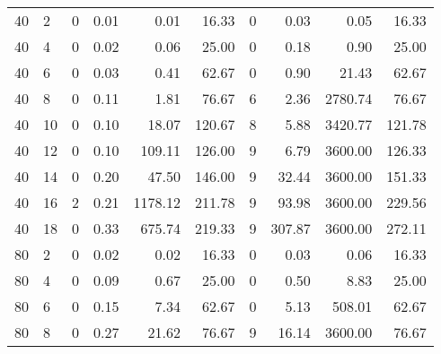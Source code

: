 \begin{appendices}
\begin{table*}[h]
\begin{center}
\begin{tabular} {l l | r r r r | r r r r}
 40 & 2                                  &  0           &  0.01         &  0.01      &  16.33           &  0            &   0.03       & 0.05        &  16.33       \\ 
 40 & 4                                  &  0           &  0.02         &  0.06      &  25.00           &  0            &   0.18       & 0.90        &  25.00       \\ 
 40 & 6                                  &  0           &  0.03         &  0.41      &  62.67           &  0            &   0.90       & 21.43       &  62.67       \\ 
 40 & 8                                  &  0           &  0.11         &  1.81      &  76.67           &  6            &   2.36       & 2780.74     &  76.67       \\ 
 40 & 10                                 &  0           &  0.10         &  18.07     &  120.67          &  8            &   5.88       & 3420.77     &  121.78      \\ 
 40 & 12                                 &  0           &  0.10         &  109.11    &  126.00          &  9            &   6.79       & 3600.00     &  126.33      \\ 
 40 & 14                                 &  0           &  0.20         &  47.50     &  146.00          &  9            &   32.44      & 3600.00     &  151.33      \\ 
 40 & 16                                 &  2           &  0.21         &  1178.12   &  211.78          &  9            &   93.98      & 3600.00     &  229.56      \\ 
 40 & 18                                 &  0           &  0.33         &  675.74    &  219.33          &  9            &   307.87     & 3600.00     &  272.11      \\ 
 80 & 2                                  &  0           &  0.02         &  0.02      &  16.33           &  0            &   0.03       & 0.06        &  16.33       \\ 
 80 & 4                                  &  0           &  0.09         &  0.67      &  25.00           &  0            &   0.50       & 8.83        &  25.00       \\ 
 80 & 6                                  &  0           &  0.15         &  7.34      &  62.67           &  0            &   5.13       & 508.01      &  62.67       \\ 
 80 & 8                                  &  0           &  0.27         &  21.62     &  76.67           &  9            &   16.14      & 3600.00     &  76.67       \\ 

\end{tabular}
\end{center}
\end{table*}
\end{appendices}
